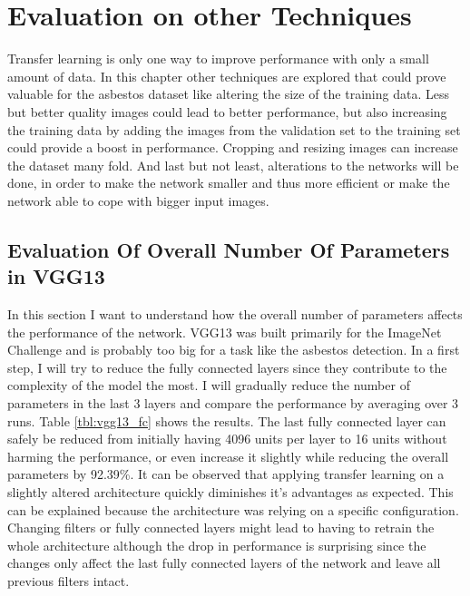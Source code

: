 \chapter{Evaluation on other Techniques}

Transfer learning is only one way to improve performance with only a small amount of data. In this chapter other techniques are explored that could prove valuable for the asbestos dataset like altering the size of the training data. Less but better quality images could lead to better performance, but also increasing the training data by adding the images from the validation set to the training set could provide a boost in performance. Cropping and resizing images can increase the dataset many fold. And last but not least, alterations to the networks will be done, in order to make the network smaller and thus more efficient or make the network able to cope with bigger input images.

\section{Evaluation Of Overall Number Of Parameters in VGG13}

In this section I want to understand how the overall number of parameters affects the performance of the network. VGG13 was built primarily for the ImageNet Challenge and is probably too big for a task like the asbestos detection. In a first step, I will try to reduce the fully connected layers since they contribute to the complexity of the model the most. I will gradually reduce the number of parameters in the last 3 layers and compare the performance by averaging over 3 runs. Table \ref{tbl:vgg13_fc} shows the results. The last fully connected layer can safely be reduced from initially having 4096 units per layer to 16 units without harming the performance, or even increase it slightly while reducing the overall parameters by 92.39\%. It can be observed that applying transfer learning on a slightly altered architecture quickly diminishes it's advantages as expected. This can be explained because the architecture was relying on a specific configuration. Changing filters or fully connected layers might lead to having to retrain the whole architecture although the drop in performance is surprising since the changes only affect the last fully connected layers of the network and leave all previous filters intact.


